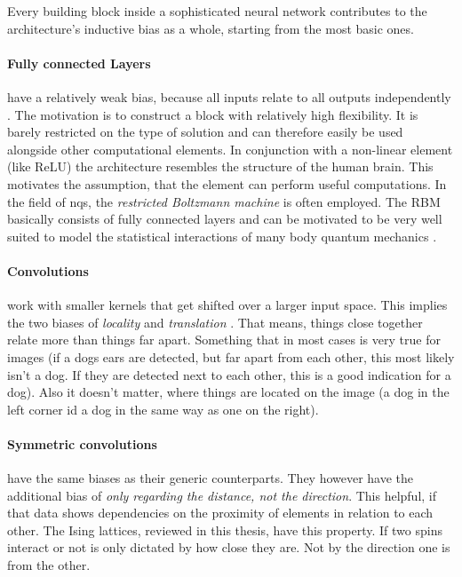 Every building block inside a sophisticated neural network contributes to the architecture's inductive bias as a whole, starting from the most basic ones.

\paragraph{Fully connected Layers} have a relatively weak bias, because all inputs relate to all outputs independently \cite{relationalInductiveBiasesAndGraphNetworks}. 
The motivation is to construct a block with relatively high flexibility.
It is barely restricted on the type of solution and can therefore easily be used alongside other computational elements.
In conjunction with a non-linear element (like ReLU) the architecture resembles the structure of the human brain. 
This motivates the assumption, that the element can perform useful computations.
In the field of nqs, the \emph{restricted Boltzmann machine} is often employed.
The RBM basically consists of fully connected layers and can be motivated to be very well suited to model the statistical interactions of many body quantum mechanics \cite{restrictedBoltzmanMachines}. 

\paragraph{Convolutions} work with smaller kernels that get shifted over a larger input space.
This implies the two biases of \emph{locality} and \emph{translation} \cite{relationalInductiveBiasesAndGraphNetworks}.
That means, things close together relate more than things far apart. 
Something that in most cases is very true for images (if a dogs ears are detected, but far apart from each other, this most likely isn't a dog. If they are detected next to each other, this is a good indication for a dog).
Also it doesn't matter, where things are located on the image (a dog in the left corner id a dog in the same way as one on the right).

\paragraph{Symmetric convolutions} have the same biases as their generic counterparts. They however have the additional bias of \emph{only regarding the distance, not the direction}.
This helpful, if that data shows dependencies on the proximity of elements in relation to each other. 
The Ising lattices, reviewed in this thesis, have this property. 
If two spins interact or not is only dictated by how close they are.
Not by the direction one is from the other.

